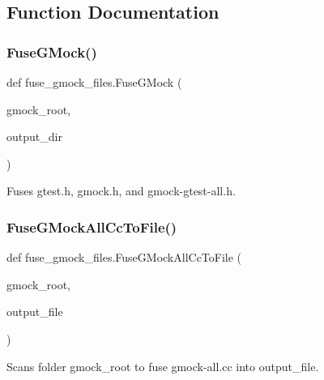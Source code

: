 \subsection{Function Documentation}
\mbox{\label{namespacefuse__gmock__files_ae76b6bc18373325fc3f002abf5c4378f}} 
\subsubsection{\texorpdfstring{FuseGMock()}{FuseGMock()}}
{\footnotesize\ttfamily def fuse\+\_\+gmock\+\_\+files.\+Fuse\+G\+Mock (\begin{DoxyParamCaption}\item[{}]{gmock\+\_\+root,  }\item[{}]{output\+\_\+dir }\end{DoxyParamCaption})}

\begin{DoxyVerb}Fuses gtest.h, gmock.h, and gmock-gtest-all.h.\end{DoxyVerb}
 \mbox{\label{namespacefuse__gmock__files_af470a39a4df492b1ca0d9493eac8222b}} 
\subsubsection{\texorpdfstring{FuseGMockAllCcToFile()}{FuseGMockAllCcToFile()}}
{\footnotesize\ttfamily def fuse\+\_\+gmock\+\_\+files.\+Fuse\+G\+Mock\+All\+Cc\+To\+File (\begin{DoxyParamCaption}\item[{}]{gmock\+\_\+root,  }\item[{}]{output\+\_\+file }\end{DoxyParamCaption})}

\begin{DoxyVerb}Scans folder gmock_root to fuse gmock-all.cc into output_file.\end{DoxyVerb}
 \mbox{\label{namespacefuse__gmock__files_a50eb499fcb075e19191e8403bd85c813}} 
